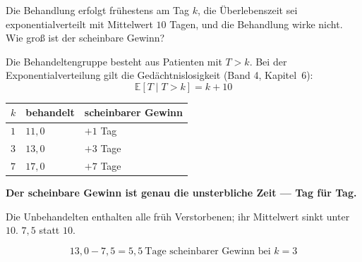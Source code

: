 \begin{aufgabe}
Die Behandlung erfolgt frühestens am Tag $k$, die Überlebenszeit sei exponentialverteilt mit Mittelwert $10$ Tagen, und die Behandlung wirke nicht. Wie groß ist der scheinbare Gewinn?

\loesung
{}
Die Behandeltengruppe besteht aus Patienten mit $T > k$. Bei der Exponentialverteilung gilt die Gedächtnislosigkeit (Band 4, Kapitel~6):
\[ \mathbb{E}[T \mid T > k] = k + 10 \]

\begin{center}
{\small
\renewcommand{\arraystretch}{1.48}
\begin{tabular}{@{}P{1.6cm}P{2.4cm}P{2.6cm}@{}}
\toprule
$k$ & \textbf{behandelt} & \textbf{scheinbarer Gewinn}\\
\midrule
$1$ & $11{,}0$ & $+1$ Tag\\
$3$ & $13{,}0$ & $+3$ Tage\\
$7$ & $17{,}0$ & $+7$ Tage\\
\bottomrule
\end{tabular}}
\end{center}

\begin{center}
\begin{minipage}{0.9\textwidth}
\textbf{Der scheinbare Gewinn ist genau die unsterbliche Zeit --- Tag für Tag.}
\end{minipage}
\end{center}

Die Unbehandelten enthalten alle früh Verstorbenen; ihr Mittelwert sinkt unter $10$.  $7{,}5$ statt $10$.

\[ 13{,}0 - 7{,}5 = 5{,}5 \ \text{Tage scheinbarer Gewinn bei } k = 3 \]

\begin{center}
\begin{minipage}{0.88\textwidth}
\end{minipage}
\end{center}
\end{aufgabe}

